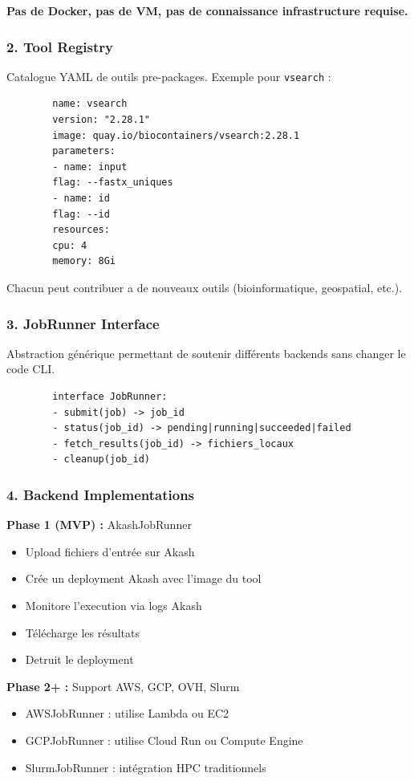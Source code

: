 \documentclass[11pt,a4paper]{article}
\begin{document}
	\textbf{Pas de Docker, pas de VM, pas de connaissance infrastructure requise.}
	
	\subsubsection{2. Tool Registry}
	
	Catalogue YAML de outils pre-packages. Exemple pour \texttt{vsearch} :
	
	\begin{lstlisting}
		name: vsearch
		version: "2.28.1"
		image: quay.io/biocontainers/vsearch:2.28.1
		parameters:
		- name: input
		flag: --fastx_uniques
		- name: id
		flag: --id
		resources:
		cpu: 4
		memory: 8Gi
	\end{lstlisting}
	
	Chacun peut contribuer a de nouveaux outils (bioinformatique, geospatial, etc.).
	
	\subsubsection{3. JobRunner Interface}
	
	Abstraction générique permettant de soutenir différents backends sans changer le code CLI.
	
	\begin{lstlisting}
		interface JobRunner:
		- submit(job) -> job_id
		- status(job_id) -> pending|running|succeeded|failed
		- fetch_results(job_id) -> fichiers_locaux
		- cleanup(job_id)
	\end{lstlisting}
	
	\subsubsection{4. Backend Implementations}
	
	\textbf{Phase 1 (MVP) :} AkashJobRunner
	\begin{itemize}
		\item Upload fichiers d'entrée sur Akash
		\item Crée un deployment Akash avec l'image du tool
		\item Monitore l'execution via logs Akash
		\item Télécharge les résultats
		\item Detruit le deployment
	\end{itemize}
	
	\textbf{Phase 2+ :} Support AWS, GCP, OVH, Slurm
	\begin{itemize}
		\item AWSJobRunner : utilise Lambda ou EC2
		\item GCPJobRunner : utilise Cloud Run ou Compute Engine
		\item SlurmJobRunner : intégration HPC traditionnels
	\end{itemize}
	
\end{document}

